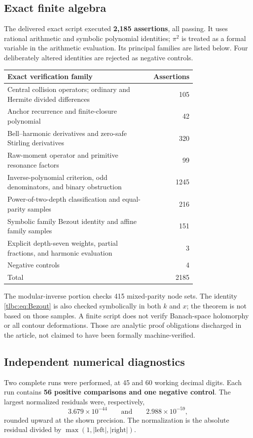 \documentclass[11pt,letterpaper]{article}
\numberwithin{equation}{section}
\theoremstyle{definition}\newtheorem{definition}[theorem]{Definition}
\theoremstyle{remark}\newtheorem{remark}[theorem]{Remark}
\begin{document}
\subsection{Exact finite algebra}
The delivered exact script executed \textbf{2,185 assertions}, all passing. It uses rational arithmetic and symbolic polynomial identities; $\pi^2$ is treated as a formal variable in the arithmetic evaluation. Its principal families are listed below. Four deliberately altered identities are rejected as negative controls.
\begin{center}
\begin{tabular}{@{}p{0.76\linewidth}r@{}}
\toprule
Exact verification family & Assertions\\
\midrule
Central collision operators; ordinary and Hermite divided differences &105\\
Anchor recurrence and finite-closure polynomial &42\\
Bell--harmonic derivatives and zero-safe Stirling derivatives &320\\
Raw-moment operator and primitive resonance factors &99\\
Inverse-polynomial criterion, odd denominators, and binary obstruction &1245\\
Power-of-two-depth classification and equal-parity samples &216\\
Symbolic family Bezout identity and affine family samples &151\\
Explicit depth-seven weights, partial fractions, and harmonic evaluation &3\\
Negative controls &4\\
\midrule
Total &2185\\
\bottomrule
\end{tabular}
\end{center}
The modular-inverse portion checks 415 mixed-parity node sets. The identity \eqref{tlbc:eq:Bezout} is also checked symbolically in both $k$ and $x$; the theorem is not based on those samples. A finite script does not verify Banach-space holomorphy or all contour deformations. Those are analytic proof obligations discharged in the article, not claimed to have been formally machine-verified.

\subsection{Independent numerical diagnostics}
Two complete runs were performed, at 45 and 60 working decimal digits. Each run contains \textbf{56 positive comparisons and one negative control}. The largest normalized residuals were, respectively,
\[
 3.679\times10^{-44}\qquad\text{and}\qquad 2.988\times10^{-59},
\]
rounded upward at the shown precision. The normalization is the absolute residual divided by $\max(1,|\mathrm{left}|,|\mathrm{right}|)$.
\end{document}
